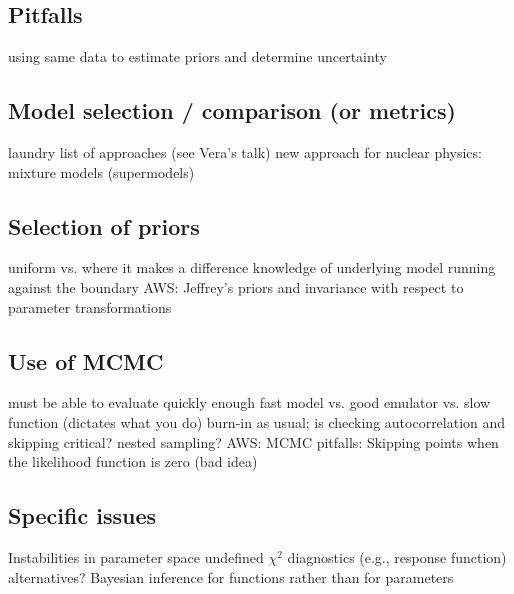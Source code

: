 \subsection{Pitfalls}  \label{subsec:pitfalls}

  \bi
    \I using same data to estimate priors and determine uncertainty
  \ei


\subsection{Model selection / comparison (or metrics)}  \label{subsec:model_comparison}

  \bi
    \I laundry list of approaches (see Vera's talk)
    \I new approach for nuclear physics: mixture models (supermodels)
  \ei


\subsection{Selection of priors}  \label{subsec:selecting_priors}

  \bi
    \I uniform vs. where it makes a difference
    \I knowledge of underlying model 
    \I running against the boundary
    \I AWS: Jeffrey's priors and invariance with respect to
    parameter transformations
  \ei


\subsection{Use of MCMC}  \label{subsec:using_mcmc}

  \bi
    \I must be able to evaluate quickly enough
    \I fast model vs. good emulator vs. slow function (dictates what you do)
    \I burn-in as usual; is checking autocorrelation and skipping critical?
    \I nested sampling?
    \I AWS: MCMC pitfalls: Skipping points when the likelihood
    function is zero (bad idea)
  \ei


\subsection{Specific issues}  \label{subsec:issues}

  \bi
    \I Instabilities in parameter space
      \bi
        \I undefined $\chi^2$
        \I diagnostics (e.g., response function) 
        \I alternatives?
      \ei     
    \I Bayesian inference for functions rather than for parameters
  \ei


